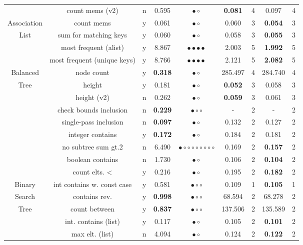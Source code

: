 {\begin{longtable}[h]{|c|c|c|c|c||c|c||c|c|}
               & count mems (v2)  & n &  0.595 & $\bullet\circ$ & {\bf 0.081}  & 4 &  0.097 & 4 \\ 
  Association  & count mems & y &  0.061 & $\bullet\circ$ &  0.060  & 3 & {\bf 0.054} & 3 \\ 
   List        & sum for matching keys & y &  0.060 & $\bullet\circ$ &  0.058  & 3 & {\bf 0.055} & 3 \\ 
               & most frequent (alist) & y &  8.867 & $\bullet\bullet\bullet\bullet$ &  2.003  & 5 & {\bf 1.992} & 5 \\ 
               & most frequent (unique keys) & y &  8.766 & $\bullet\bullet\bullet\bullet$ &  2.121  & 5 & {\bf 2.082} & 5 \\ 
			\hline
 Balanced  & node count & y & {\bf 0.318} & $\bullet\circ$ &  285.497  & 4 &  284.740 & 4 \\ 
  Tree     & height & y &  0.181 & $\bullet\circ$ & {\bf 0.052}  & 3 &  0.058 & 3 \\ 
           & height (v2) & n &  0.262 & $\bullet\circ$ & {\bf 0.059}  & 3 &  0.061 & 3 \\ 
			\hline
  & check bounds inclusion & n & {\bf 0.229} & $\bullet\circ\circ$ & -  & 2 & - & 2 \\ 
  & single-pass inclusion & n & {\bf 0.097} & $\bullet\circ$ &  0.132  & 2 &  0.127 & 2 \\ 
  & integer contains & y & {\bf 0.172} & $\bullet\circ$ &  0.184  & 2 &  0.181 & 2 \\ 
  & no subtree sum gt.2 & n &  6.490 & $\bullet\circ\circ\circ\circ\circ\circ\circ\circ$ &  0.169  & 2 & {\bf 0.157} & 2 \\ 
  & boolean contains & n &  1.730 & $\bullet\circ$ &  0.106  & 2 & {\bf 0.104} & 2 \\ 
       & count elts. < & y &  0.216 & $\bullet\circ$ &  0.195  & 2 & {\bf 0.182} & 2 \\ 
 Binary  & int contains w. const case & y &  0.581 & $\bullet\circ\circ$ &  0.109  & 1 & {\bf 0.105} & 1 \\ 
 Search  & contains rev. & y & {\bf 0.998} & $\bullet\circ\circ$ &  68.594  & 2 &  68.278 & 2 \\ 
 Tree  & count between & y & {\bf 0.837} & $\bullet\circ\circ$ &  137.506  & 2 &  135.589 & 2 \\ 
  & int. contains (list) & y &  0.117 & $\bullet\circ$ &  0.105  & 2 & {\bf 0.101} & 2 \\ 
  & max elt. (list) & n &  4.094 & $\bullet\circ$ &  0.124  & 2 & {\bf 0.122} & 2 \\ 

\end{longtable}}
